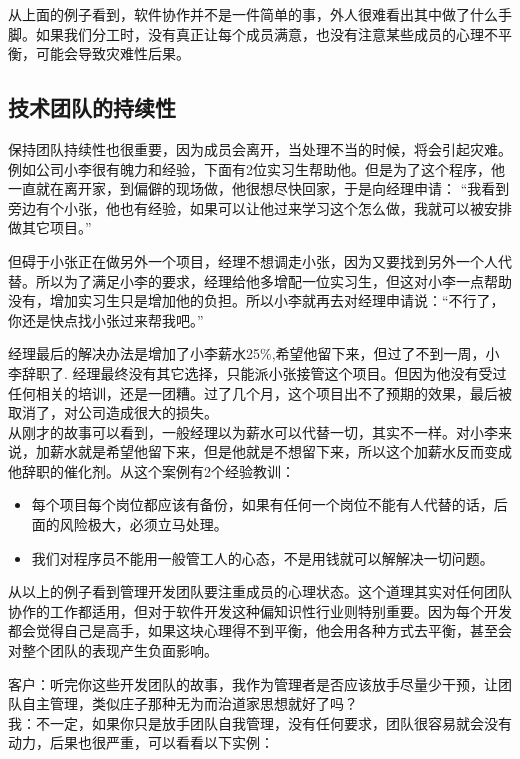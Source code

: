 从上面的例子看到，软件协作并不是一件简单的事，外人很难看出其中做了什么手脚。如果我们分工时，没有真正让每个成员满意，也没有注意某些成员的心理不平衡，可能会导致灾难性后果。

\hypertarget{ux6280ux672fux56e2ux961fux7684ux6301ux7eedux6027}{%
\subsection{技术团队的持续性}\label{ux6280ux672fux56e2ux961fux7684ux6301ux7eedux6027}}

保持团队持续性也很重要，因为成员会离开，当处理不当的时候，将会引起灾难。\\
例如公司小李很有魄力和经验，下面有2位实习生帮助他。但是为了这个程序，他一直就在离开家，到偏僻的现场做，他很想尽快回家，于是向经理申请：
``我看到旁边有个小张，他也有经验，如果可以让他过来学习这个怎么做，我就可以被安排做其它项目。''

但碍于小张正在做另外一个项目，经理不想调走小张，因为又要找到另外一个人代替。所以为了满足小李的要求，经理给他多增配一位实习生，但这对小李一点帮助没有，增加实习生只是增加他的负担。所以小李就再去对经理申请说：``不行了，你还是快点找小张过来帮我吧。''

经理最后的解决办法是增加了小李薪水25\%,希望他留下来，但过了不到一周，小李辞职了.
经理最终没有其它选择，只能派小张接管这个项目。但因为他没有受过任何相关的培训，还是一团糟。过了几个月，这个项目出不了预期的效果，最后被取消了，对公司造成很大的损失。\\
从刚才的故事可以看到，一般经理以为薪水可以代替一切，其实不一样。对小李来说，加薪水就是希望他留下来，但是他就是不想留下来，所以这个加薪水反而变成他辞职的催化剂。从这个案例有2个经验教训：

\begin{itemize}
\tightlist
\item
  每个项目每个岗位都应该有备份，如果有任何一个岗位不能有人代替的话，后面的风险极大，必须立马处理。
\item
  我们对程序员不能用一般管工人的心态，不是用钱就可以解解决一切问题。\\
\end{itemize}

从以上的例子看到管理开发团队要注重成员的心理状态。这个道理其实对任何团队协作的工作都适用，但对于软件开发这种偏知识性行业则特别重要。因为每个开发都会觉得自己是高手，如果这块心理得不到平衡，他会用各种方式去平衡，甚至会对整个团队的表现产生负面影响。

客户：听完你这些开发团队的故事，我作为管理者是否应该放手尽量少干预，让团队自主管理，类似庄子那种无为而治道家思想就好了吗？\\
我：不一定，如果你只是放手团队自我管理，没有任何要求，团队很容易就会没有动力，后果也很严重，可以看看以下实例：\\

